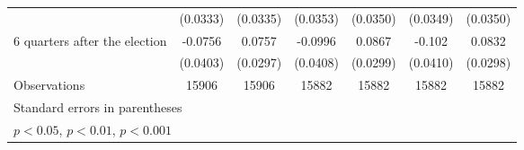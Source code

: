 \begin{table}[htbp]
\begin{tabular}{l*{6}{c}}
                    &    (0.0333)         &    (0.0335)         &    (0.0353)         &    (0.0350)         &    (0.0349)         &    (0.0350)         \\
[1em]
 6 quarters after the election&     -0.0756         &      0.0757\sym{*}  &     -0.0996\sym{*}  &      0.0867\sym{**} &      -0.102\sym{*}  &      0.0832\sym{**} \\
                    &    (0.0403)         &    (0.0297)         &    (0.0408)         &    (0.0299)         &    (0.0410)         &    (0.0298)         \\
\hline
Observations        &       15906         &       15906         &       15882         &       15882         &       15882         &       15882         \\
\hline\hline
\multicolumn{7}{l}{\footnotesize Standard errors in parentheses}\\
\multicolumn{7}{l}{\footnotesize \sym{*} \(p<0.05\), \sym{**} \(p<0.01\), \sym{***} \(p<0.001\)}\\
\end{tabular}
\end{table}
